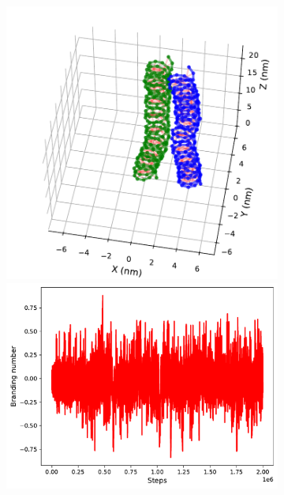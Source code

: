 \documentclass[a4paper,10pt]{article}
\begin{document}
\begin{figure}[tb]
\centering
\begin{subfigure}{.3\textwidth}
\includegraphics[width=\textwidth]{brD_5_2000000.pdf}
\includegraphics[width=\textwidth]{brD_5_brand.pdf}

\end{subfigure}
\end{figure}
\end{document}
